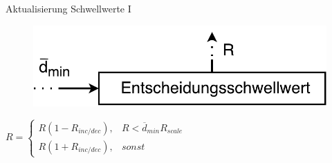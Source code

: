\documentclass[hyperref={pdfpagelabels=false}]{beamer}
\begin{document}
\begin{frame}{Aktualisierung Schwellwerte I}
	\begin{figure}
		\centering
		\includegraphics[width=.8\linewidth]{./Bilder/threshold_update/threshold_update}
	\end{figure}
	\vspace{2em}
	\begin{center}
		\Large
		$ R = \left\{\begin{array}{ll} R(1-R_{inc/dec}), & R < \overline{d}_{min}R_{scale} \\
		R(1+R_{inc/dec}), & sonst\end{array}\right.  $
	\end{center}
	
\end{frame}
\end{document}
